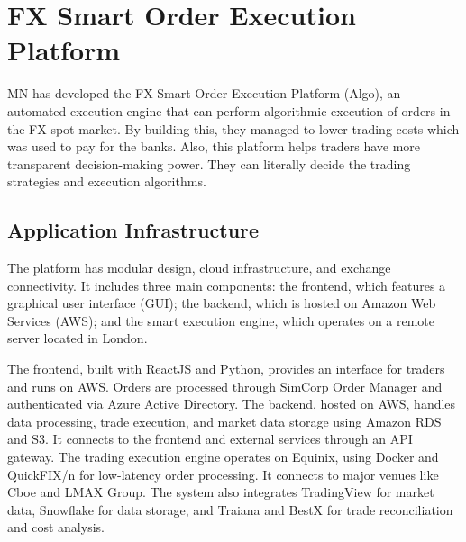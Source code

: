 





\section{FX Smart Order Execution Platform}
MN has developed the FX Smart Order Execution Platform (Algo), an automated execution engine that can perform algorithmic execution of orders in the FX spot market. By building this, they managed to lower trading costs which was used to pay for the banks. Also, this platform helps traders have more transparent decision-making power. They can literally decide the trading strategies and execution algorithms.

\subsection{Application Infrastructure}
The platform has modular design, cloud infrastructure, and exchange connectivity. It includes three main components: the frontend, which features a graphical user interface (GUI); the backend, which is hosted on Amazon Web Services (AWS); and the smart execution engine, which operates on a remote server located in London.


The frontend, built with ReactJS and Python, provides an interface for traders and runs on AWS. Orders are processed through SimCorp Order Manager and authenticated via Azure Active Directory. The backend, hosted on AWS, handles data processing, trade execution, and market data storage using Amazon RDS and S3. It connects to the frontend and external services through an API gateway. The trading execution engine operates on Equinix, using Docker and QuickFIX/n for low-latency order processing. It connects to major venues like Cboe and LMAX Group. The system also integrates TradingView for market data, Snowflake for data storage, and Traiana and BestX for trade reconciliation and cost analysis.

